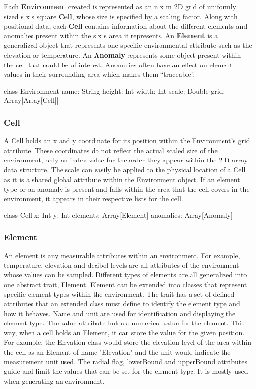 Each \textbf{Environment} created is represented as an n x m 2D grid of uniformly sized s x s square \textbf{Cell}, whose size is specified by a scaling factor.
Along with positional data, each \textbf{Cell} contains information about the different elements and anomalies present within the s x s area it represents.
An \textbf{Element} is a generalized object that represents one specific environmental attribute such as the elevation or temperature.
An \textbf{Anomaly} represents some object present within the cell that could be of interest.
Anomalies often have an effect on element values in their surrounding area which makes them “traceable”.

class Environment {
	name: String
  height: Int
  width: Int
  scale: Double
	grid: Array[Array[Cell]]
}

\subsubsection{Cell}
A Cell holds an x and y coordinate for its position within the Environment's grid attribute.
These coordinates do not reflect the actual scaled size of the environment, only an index value for the order they appear within the 2-D array data structure.
The scale can easily be applied to the physical location of a Cell as it is a shared global attribute within the Environment object.
If an element type or an anomaly is present and falls within the area that the cell covers in the environment, it appears in their respective lists for the cell.

class Cell {
  x: Int
  y: Int
  elements: Array[Element]
  anomalies: Array[Anomaly]
}

\subsubsection{Element}
An element is any measurable attributes within an environment.
For example, temperature, elevation and decibel levels are all attributes of the environment whose values can be sampled.
Different types of elements are all generalized into one abstract trait, Element.
Element can be extended into classes that represent specific element types within the environment.
The trait has a set of defined attributes that an extended class must define to identify the element type and how it behaves.
Name and unit are used for identification and displaying the element type.
The value attribute holds a numerical value for the element.
This way, when a cell holds an Element, it can store the value for the given position.
For example, the Elevation class would store the elevation level of the area within the cell as an Element of name "Elevation" and the unit would indicate the measurement unit used.
The radial flag, lowerBound and upperBound attributes guide and limit the values that can be set for the element type.
It is mostly used when generating an environment. 

